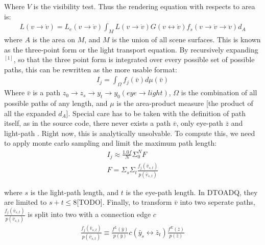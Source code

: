 \documentclass{article}
\begin{document}
    Where $V$ is the visibility test. Thus the rendering equation with respects
    to area is:
  \begin{align}
    L(v \rightarrow \dot{v}) = L_e(v \rightarrow \dot{v}) \int_ML(v \rightarrow
    \dot{v}) G(v\leftrightarrow \dot{v}) f_s(v\rightarrow \dot{v} \rightarrow
    \ddot{v}) d_A
  \end{align}
    where $A$ is the area on $M$, and $M$ is the union of all scene surfaces.
    This is known as the three-point form or the light transport equation. By
    recursively expanding$^{[1]}$, so that the three point form is integrated
    over every possible set of possible paths, this can be rewritten as the more
    usable format:
  \begin{align} I_j = \int_\Omega f_j(\bar{v}) d\mu(\bar{v}) \end{align}
    Where $\bar{v}$ is a path $z_0\rightarrow z_s \rightarrow y_t \rightarrow
    y_0 (eye \rightarrow light)$, $\Omega$ is the combination of all possible
    paths of any length, and $\mu$ is the area-product measure [the product of
    all the expanded $d_A$]. Special care has to be taken with the definition of
    path itself, as in the source code, there never exists a path $\bar{v}$,
    only eye-path $\bar{z}$ and light-path . Right now, this is analytically
    unsolvable. To compute this, we need to apply monte carlo sampling and limit
    the maximum path length:
  \begin{align}
    I_j \approx \frac{1.0f}{N}\Sigma_0^NF\\
    F = \Sigma_s\Sigma_t\frac{f_j(\bar{v}_{s, t})}{p(\bar{v}_{s, t})}
  \end{align}

    where $s$ is the light-path length, and $t$ is the eye-path length. In
    DTOADQ, they are limited to $s+t \leq 8$[TODO]. Finally, to transform
    $\bar{v}$ into two seperate paths, $\frac{f_j(\bar{v}_{s,
        t})}{p(\bar{v}_{s, t})}$ is split into two with a connection edge $c$
  \begin{align}
    \frac{f_j(\bar{v}_{s, t})}{p(\bar{v}_{s, t})} \equiv
    \frac{f^L(\bar{y})}{p(\bar{y})} c(\bar{y}_s \leftrightarrow \bar{z}_t)
    \frac{f^E(\bar{z})}{p(\bar{z})}  
  \end{align}
\end{document}
